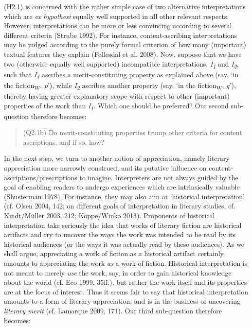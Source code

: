 \noindent (H2.1) is concerned with the rather simple case of two alternative
interpretations which are \emph{ex hypothesi} equally well supported in
all other relevant respects. However, interpretations can be more or
less convincing according to several different criteria (Strube 1992).
For instance, content-ascribing interpretations may be judged according
to the purely formal criterion of how many (important) textual features
they explain (F\o{}llesdal et al. 2008). Now, suppose that we have two
(otherwise equally well supported) incompatible interpretations,
\emph{I\textsubscript{1}} and \emph{I\textsubscript{2}}, such that
\emph{I\textsubscript{1}} ascribes a merit-constituting property as
explained above (say, `in the fiction\textsubscript{W}, \emph{p}'),
while \emph{I\textsubscript{2}} ascribes another property (say, `in the
fiction\textsubscript{W}, \emph{q}'), thereby having greater explanatory
scope with respect to other (important) properties of the work than
\emph{I\textsubscript{1}}. Which one should be preferred? Our second
sub-question therefore becomes:

\vspace{-.2cm}
\begin{quote}
(Q2.1b)  Do merit-constituting properties trump other criteria for
content ascriptions, and if so, how?
\end{quote}
\vspace{-.2cm}

\noindent In the next step, we turn to another notion of appreciation, namely
literary appreciation more narrowly construed, and its putative
influence on content-ascriptions/prescriptions to imagine. Interpreters
are not always guided by the goal of enabling readers to undergo
experiences which are intrinsically valuable (Shusterman 1978). For
instance, they may also aim at `historical interpretation' (cf. Olsen
2004, 142; on different goals of interpretation in literary studies, cf.
Kindt/M\"uller 2003, 212; K\"oppe/Winko 2013). Proponents of historical
interpretation take seriously the idea that works of literary fiction
are historical artifacts and try to uncover the ways the work was
intended to be read by its historical audiences (or the ways it was
actually read by these audiences). As we shall argue, appreciating a
work of fiction as a historical artifact certainly amounts to
appreciating the work \emph{as} a work of fiction. Historical
interpretation is not meant to merely \emph{use} the work, say, in order
to gain historical knowledge about the world (cf. Eco 1999, 35ff.), but
rather the work itself and its properties are at the focus of interest.
Thus it seems fair to say that historical interpretation amounts to a
form of literary appreciation, and is in the business of uncovering
\emph{literary merit} (cf. Lamarque 2009, 171). Our third sub-question
therefore becomes:

